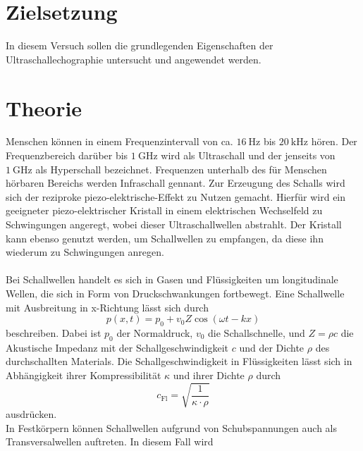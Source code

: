\section{Zielsetzung}
\label{sec:Zielsetzung}

In diesem Versuch sollen die grundlegenden Eigenschaften der Ultraschallechographie untersucht und angewendet werden.

\section{Theorie}
\label{sec:Theorie}
Menschen können in einem Frequenzintervall von ca. $\SI{16}{\hertz}$ bis $\SI{20}{\kilo\hertz}$ hören. Der Frequenzbereich darüber bis $\SI{1}{\giga\hertz}$ wird als
Ultraschall und der jenseits von $\SI{1}{\giga\hertz}$ als Hyperschall bezeichnet. Frequenzen unterhalb des für Menschen hörbaren Bereichs werden Infraschall gennant.
\newline
Zur Erzeugung des Schalls wird sich der reziproke piezo-elektrische-Effekt zu Nutzen gemacht. Hierfür wird ein geeigneter piezo-elektrischer Kristall in einem
elektrischen Wechselfeld zu Schwingungen angeregt, wobei dieser Ultraschallwellen abstrahlt. Der Kristall kann ebenso genutzt werden, um Schallwellen zu empfangen,
da diese ihn wiederum zu Schwingungen anregen.\\
\\
\label{sec:Schallwellen}
Bei Schallwellen handelt es sich in Gasen und Flüssigkeiten um longitudinale Wellen, die sich in Form von Druckschwankungen fortbewegt.
Eine Schallwelle mit Ausbreitung in x-Richtung lässt sich durch
\begin{equation}
    p(x, t) = p_0 + v_0 Z \cos{(\omega t - kx)}
\end{equation}
beschreiben. Dabei ist $p_0$ der Normaldruck, $v_0$ die Schallschnelle, und $Z=\rho c$ die Akustische
Impedanz mit der Schallgeschwindigkeit $c$ und der Dichte $\rho$ des durchschallten Materials.
Die Schallgeschwindigkeit in Flüssigkeiten lässt sich in Abhängigkeit ihrer Kompressibilität $\kappa$ und ihrer
Dichte $\rho$ durch
\begin{equation}
    c_{\mathrm{Fl}} = \sqrt{\frac{1}{\kappa \cdot \rho}}
\end{equation}
ausdrücken. \\
In Festkörpern können Schallwellen aufgrund von Schubspannungen auch als Transversalwellen auftreten. In diesem Fall wird 
